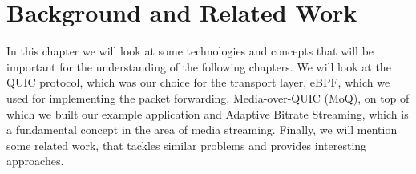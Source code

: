 
\chapter{Background and Related Work}\label{chap:background}

In this chapter we will look at some technologies and concepts 
that will be important for the understanding of the following chapters.
We will look at the QUIC protocol, which was our choice for the 
transport layer, eBPF, which we used for implementing the packet 
forwarding, Media-over-QUIC (MoQ), on top of which we built 
our example application and Adaptive Bitrate Streaming, which is
a fundamental concept in the area of media streaming.
Finally, we will mention some related work, that tackles similar 
problems and provides interesting approaches.  





